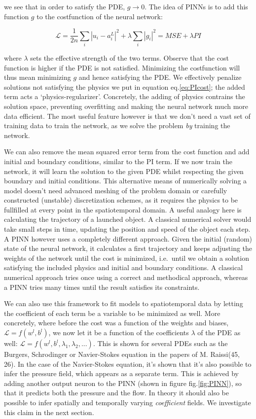 \documentclass[12pt,a4paper,]{Dissertate}
\begin{document}
we see that in order to satisfy the PDE, \(g\to0\). The idea of PINNs is
to add this function \(g\) to the costfunction of the neural network:

\[
\mathcal{L} = \frac{1}{2n}\sum_i|u_i-a^L_i|^2 + \lambda\sum_i|g_i|^2 = MSE + \lambda PI
\]

where \(\lambda\) sets the effective strength of the two terms. Observe
that the cost function is higher if the PDE is not satisfied. Minimizing
the costfunction will thus mean minimizing \(g\) and hence satisfying
the PDE. We effectively penalize solutions not satisfying the physics we
put in equation eq.\ref{eq:PIcost}; the added term acts a
`physics-regularizer'. Concretely, the adding of physics contrains the
solution space, preventing overfitting and making the neural network
much more data efficient. The most useful feature however is that we
don't need a vast set of training data to train the network, as we solve
the problem \emph{by} training the network.

We can also remove the mean squared error term from the cost function
and add initial and boundary conditions, similar to the PI term. If we
now train the network, it will learn the solution to the given PDE
whilst respecting the given boundary and initial conditions. This
alternative means of numerically solving a model doesn't need advanced
meshing of the problem domain or carefully constructed (unstable)
discretization schemes, as it requires the physics to be fullfilled at
every point in the spatiotemporal domain. A useful analogy here is
calculating the trajectory of a launched object. A classical numerical
solver would take small steps in time, updating the position and speed
of the object each step. A PINN however uses a completely different
approach. Given the initial (random) state of the neural network, it
calculates a first trajectory and keeps adjusting the weights of the
network until the cost is minimized, i.e.~until we obtain a solution
satisfying the included physics and initial and boundary conditions. A
classical numerical approach tries once using a correct and methodical
approach, whereas a PINN tries many times until the result satisfies its
constraints.

We can also use this framework to fit models to spatiotemporal data by
letting the coefficient of each term be a variable to be minimized as
well. More concretely, where before the cost was a function of the
weights and biases, \(\mathcal{L}=f(w^l, b^l)\), we now let it be a
function of the coefficients \(\lambda\) of the PDE as well:
\(\mathcal{L}=f(w^l, b^l, \lambda_1, \lambda_2,...)\). This is shown for
several PDEs such as the Burgers, Schrodinger or Navier-Stokes equation
in the papers of M. Raissi(45, 26). In the case of the Navier-Stokes
equation, it's shown that it's also possible to infer the pressure
field, which appears as a separate term. This is achieved by adding
another output neuron to the PINN (shown in figure fig.\ref{fig:PINN}),
so that it predicts both the pressure and the flow. In theory it should
also be possible to infer spatially and temporally varying
\emph{coefficient} fields. We investigate this claim in the next
section.
\end{document}
